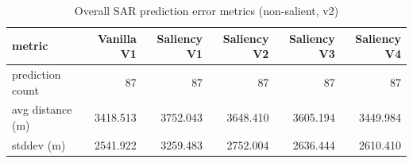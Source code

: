 \begin{table}[ht]
\centering
\caption{Overall SAR prediction error metrics (non-salient, v2)}
\label{tab:sar-overall-errors-non-salient,-v2}
\begin{tabular}{lrrrrr}
\hline
metric & Vanilla V1 & Saliency V1 & Saliency V2 & Saliency V3 & Saliency V4 \\
\hline
prediction count & 87 & 87 & 87 & 87 & 87 \\
avg distance (m) & 3418.513 & 3752.043 & 3648.410 & 3605.194 & 3449.984 \\
stddev (m) & 2541.922 & 3259.483 & 2752.004 & 2636.444 & 2610.410 \\
\hline
\end{tabular}
\end{table}
